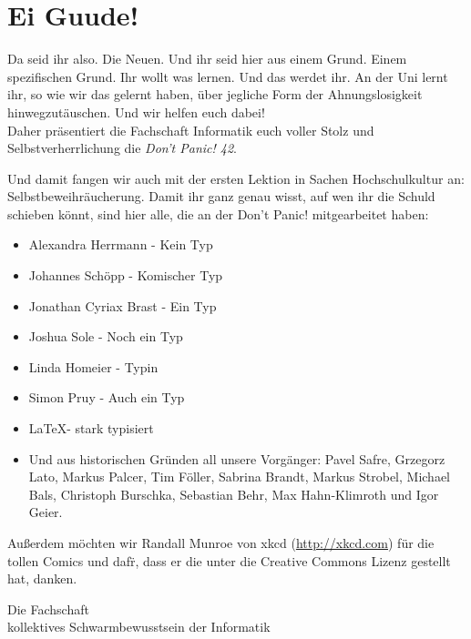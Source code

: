 \section*{Ei Guude!}
Da seid ihr also. Die Neuen. Und ihr seid hier aus einem Grund. Einem spezifischen Grund. Ihr wollt was lernen.
Und das werdet ihr. An der Uni lernt ihr, so wie wir das gelernt haben,
\"uber jegliche Form der Ahnungslosigkeit hinwegzut\"auschen. Und wir helfen euch dabei!\\
Daher pr\"asentiert die Fachschaft Informatik euch voller Stolz und Selbstverherrlichung die \emph{Don't Panic! 42}.

Und damit fangen wir auch mit der ersten Lektion in Sachen Hochschulkultur an: Selbstbeweihr\"aucherung.
Damit ihr ganz genau wisst, auf wen ihr die Schuld schieben k\"onnt, sind hier alle, die an der Don't Panic! mitgearbeitet haben:
\begin{itemize}
	\item Alexandra Herrmann - Kein Typ
	\item Johannes Schöpp - Komischer Typ
	\item Jonathan Cyriax Brast - Ein Typ
	\item Joshua Sole - Noch ein Typ
	\item Linda Homeier - Typin
	\item Simon Pruy - Auch ein Typ
	\item \LaTeX - stark typisiert
	\item Und aus historischen Gr\"unden all unsere Vorg\"anger:
	Pavel Safre, Grzegorz Lato, Markus Palcer, Tim F\"oller, Sabrina Brandt, Markus Strobel, Michael Bals, Christoph Burschka, Sebastian Behr, Max Hahn-Klimroth und Igor Geier.
\end{itemize}
Außerdem möchten wir Randall Munroe von xkcd (\url{http://xkcd.com}) für die tollen Comics und daf\"r, dass er die unter die Creative Commons Lizenz gestellt hat, danken.\\

\begin{flushright}Die Fachschaft\\\tiny kollektives Schwarmbewusstsein der Informatik\end{flushright}
